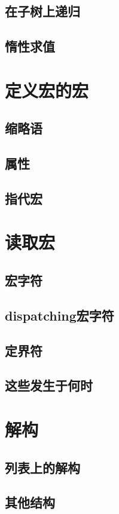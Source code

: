 \documentclass{ctexart}
\begin{document}
\subsection{在子树上递归}
\label{sec-15-3}
\subsection{惰性求值}
\label{sec-15-4}
\section{定义宏的宏}
\label{sec-16}
\subsection{缩略语}
\label{sec-16-1}
\subsection{属性}
\label{sec-16-2}
\subsection{指代宏}
\label{sec-16-3}
\section{读取宏}
\label{sec-17}
\subsection{宏字符}
\label{sec-17-1}
\subsection{dispatching宏字符}
\label{sec-17-2}
\subsection{定界符}
\label{sec-17-3}
\subsection{这些发生于何时}
\label{sec-17-4}
\section{解构}
\label{sec-18}
\subsection{列表上的解构}
\label{sec-18-1}
\subsection{其他结构}
\label{sec-18-2}
\end{document}
